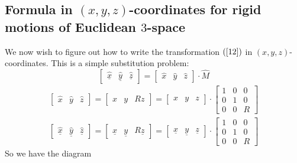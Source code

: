 \documentclass{ximera}
\begin{document}
\subsection*{Formula in $\left(  x,y,z\right)  $-coordinates for rigid motions
of Euclidean $3$-space}

We now wish to figure out how to write the transformation $\left(
\ref{12}\right)  $ in $\left(  x,y,z\right)  $-coordinates. This is a simple
substitution problem:%
\begin{equation}
\begin{bmatrix}
%
\underline{\hat{x}} & \underline{\hat{y}} & \underline{\hat{z}}%
\end{bmatrix}
  =\begin{bmatrix}
%
\hat{x} & \hat{y} & \hat{z}%
\end{bmatrix}
          \cdot\hat{M} \label{100}%
\end{equation}%
\begin{gather*}
\begin{bmatrix}
%
\hat{x} & \hat{y} & \hat{z}%
\end{bmatrix}
=\begin{bmatrix}
%
x & y & Rz
\end{bmatrix}
=\begin{bmatrix}
%
x & y & z
\end{bmatrix}
\cdot\begin{bmatrix}
%
1 & 0 & 0\\
0 & 1 & 0\\
0 & 0 & R
\end{bmatrix}\\
\begin{bmatrix}
%
\underline{\hat{x}} & \underline{\hat{y}} & \underline{\hat{z}}%
\end{bmatrix}
=\begin{bmatrix}
%
\underline{x} & \underline{y} & R\underline{z}%
\end{bmatrix}
=\begin{bmatrix}
%
\underline{x} & \underline{y} & \underline{z}%
\end{bmatrix}
\cdot\begin{bmatrix}
%
1 & 0 & 0\\
0 & 1 & 0\\
0 & 0 & R
\end{bmatrix}
\end{gather*}
So we have the diagram%
\end{document}
